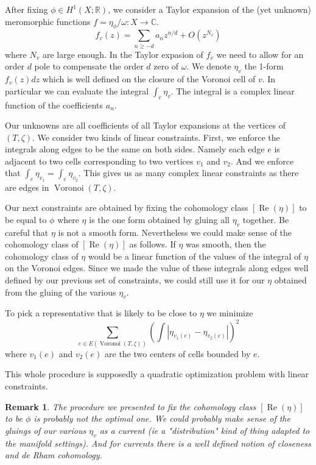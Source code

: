 \documentclass[a4paper,12pt]{article}
\def\bC{\mathbb{C}}
\def\bR{\mathbb{R}}
\def\Re{\operatorname{Re}}
\def\Voronoi{\operatorname{Voronoi}}
\newtheorem{remark}[definition]{Remark}
\begin{document}
After fixing $\phi \in H^1(X; \bR)$, we consider a Taylor expansion of the
(yet unknown) meromorphic functions
$f = \eta_\phi / \omega: X \to \bC$.
\begin{equation}
f_v(z) = \sum_{n \geq -d} a_n z^{n/d} + O(z^{N_v})
\end{equation}
where $N_v$ are large enough. In the Taylor expasion of $f_v$ we need to allow
for an order $d$ pole to compensate the order $d$ zero of $\omega$. We denote
$\eta_v$ the 1-form $f_v(z) dz$ which is well defined on the closure of the
Voronoi cell of $v$. In particular we can evaluate the integral
$\int_e \eta_v$. The integral is a complex linear function
of the coefficients $a_n$.

Our unknowns are all coefficients of all Taylor expansions at the vertices
of $(T, \zeta)$. We consider two kinds of linear constraints. First,
we enforce the integrals along edges to be the same on both sides. Namely
each edge $e$ is adjacent to two cells corresponding to two vertices $v_1$
and $v_2$. And we enforce that $\int_e \eta_{v_1} = \int_e \eta_{v_2}$.
This gives us as many complex linear constraints as there are edges
in $\Voronoi(T, \zeta)$.

Our next constraints are obtained by fixing the cohomology class
$[\Re(\eta)]$ to be equal to $\phi$ where $\eta$ is the one form
obtained by gluing all $\eta_v$ together. Be careful that $\eta$ is
not a smooth form. Nevertheless we could make sense of the cohomology
class of $[\Re(\eta)]$ as follows. If $\eta$ was smooth, then the 
cohomology class of $\eta$ would be a linear function of the values
of the integral of $\eta$ on the Voronoi edges. Since we made the
value of these integrals along edges well defined by our previous
set of constraints, we could still use it for our $\eta$ obtained
from the gluing of the various $\eta_v$.

To pick a representative that is likely to be close to $\eta$ we
minimize
\begin{equation}
\label{eq:quadraticObjective}
\sum_{e \in E(\Voronoi(T,\zeta))} \left(\int |\eta_{v_1(e)} - \eta_{v_2(e)}|\right)^2
\end{equation}
where $v_1(e)$ and $v_2(e)$ are the two centers of cells bounded by $e$.


This whole procedure is supposedly a quadratic optimization problem with
linear constraints.

\begin{remark}
The procedure we presented to fix the cohomology class $[\Re(\eta)]$ to be
$\phi$ is probably not the optimal one. We could probably make sense of the
gluings of our various $\eta_v$ as a \emph{current} (ie a "distribution" kind
of thing adapted to the manifold settings). And for currents there is a well
defined notion of closeness and de Rham cohomology.
\end{remark}
\end{document}
